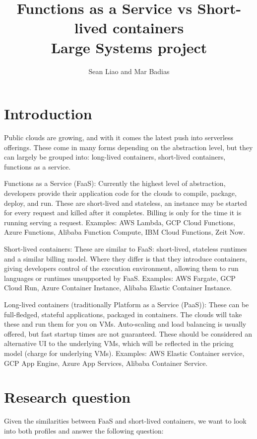 \documentclass[11pt]{article}
\title{%
  Functions as a Service vs Short-lived containers \\
  \large Large Systems project}
\author{Sean Liao and Mar Badias}
\begin{document}
\maketitle



\section{Introduction}
Public clouds are growing, and with it comes the latest push into serverless offerings. These come in many forms depending on the abstraction level, but they can largely be grouped into: long-lived containers, short-lived containers, functions as a service.

Functions as a Service (FaaS): Currently the highest level of abstraction, developers provide their application code for the clouds to compile, package, deploy, and run. These are short-lived and stateless, an instance may be started for every request and killed after it completes. Billing is only for the time it is running serving a request. Examples: AWS Lambda, GCP Cloud Functions, Azure Functions, Alibaba Function Compute, IBM Cloud Functions, Zeit Now.

Short-lived containers: These are similar to FaaS: short-lived, stateless runtimes and a similar billing model. Where they differ is that they introduce containers, giving developers control of the execution environment, allowing them to run languages or runtimes unsupported by FaaS. Examples: AWS Fargate, GCP Cloud Run, Azure Container Instance, Alibaba Elastic Container Instance.

Long-lived containers (traditionally Platform as a Service (PaaS)): These can be full-fledged, stateful applications, packaged in containers. The clouds will take these and run them for you on VMs. Auto-scaling and load balancing is usually offered, but fast startup times are not guaranteed. These should be considered an alternative UI to the underlying VMs, which will be reflected in the pricing model (charge for underlying VMs). Examples: AWS Elastic Container service, GCP App Engine, Azure App Services, Alibaba Container Service.


\section{Research question}
Given the similarities between FaaS and short-lived containers, we want to look into both profiles and answer the following question:
\end{document}
